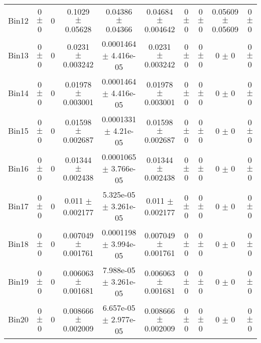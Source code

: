 \begin{tabular}{@{\extracolsep{4pt}}lccccccccc@{}}
     Bin12 & 0 $\pm$ 0 & 0 & 0.1029 $\pm$ 0.05628 & 0.04386 $\pm$ 0.04366 & 0.04684 $\pm$ 0.004642 & 0 $\pm$ 0 & 0 $\pm$ 0 & 0.05609 $\pm$ 0.05609 & 0 $\pm$ 0 \\ 
     Bin13 & 0 $\pm$ 0 & 0 & 0.0231 $\pm$ 0.003242 & 0.0001464 $\pm$ 4.416e-05 & 0.0231 $\pm$ 0.003242 & 0 $\pm$ 0 & 0 $\pm$ 0 & 0 $\pm$ 0 & 0 $\pm$ 0 \\ 
     Bin14 & 0 $\pm$ 0 & 0 & 0.01978 $\pm$ 0.003001 & 0.0001464 $\pm$ 4.416e-05 & 0.01978 $\pm$ 0.003001 & 0 $\pm$ 0 & 0 $\pm$ 0 & 0 $\pm$ 0 & 0 $\pm$ 0 \\ 
     Bin15 & 0 $\pm$ 0 & 0 & 0.01598 $\pm$ 0.002687 & 0.0001331 $\pm$ 4.21e-05 & 0.01598 $\pm$ 0.002687 & 0 $\pm$ 0 & 0 $\pm$ 0 & 0 $\pm$ 0 & 0 $\pm$ 0 \\ 
     Bin16 & 0 $\pm$ 0 & 0 & 0.01344 $\pm$ 0.002438 & 0.0001065 $\pm$ 3.766e-05 & 0.01344 $\pm$ 0.002438 & 0 $\pm$ 0 & 0 $\pm$ 0 & 0 $\pm$ 0 & 0 $\pm$ 0 \\ 
     Bin17 & 0 $\pm$ 0 & 0 & 0.011 $\pm$ 0.002177 & 5.325e-05 $\pm$ 3.261e-05 & 0.011 $\pm$ 0.002177 & 0 $\pm$ 0 & 0 $\pm$ 0 & 0 $\pm$ 0 & 0 $\pm$ 0 \\ 
     Bin18 & 0 $\pm$ 0 & 0 & 0.007049 $\pm$ 0.001761 & 0.0001198 $\pm$ 3.994e-05 & 0.007049 $\pm$ 0.001761 & 0 $\pm$ 0 & 0 $\pm$ 0 & 0 $\pm$ 0 & 0 $\pm$ 0 \\ 
     Bin19 & 0 $\pm$ 0 & 0 & 0.006063 $\pm$ 0.001681 & 7.988e-05 $\pm$ 3.261e-05 & 0.006063 $\pm$ 0.001681 & 0 $\pm$ 0 & 0 $\pm$ 0 & 0 $\pm$ 0 & 0 $\pm$ 0 \\ 
     Bin20 & 0 $\pm$ 0 & 0 & 0.008666 $\pm$ 0.002009 & 6.657e-05 $\pm$ 2.977e-05 & 0.008666 $\pm$ 0.002009 & 0 $\pm$ 0 & 0 $\pm$ 0 & 0 $\pm$ 0 & 0 $\pm$ 0 \\ 
\hline\hline
  \end{tabular}
